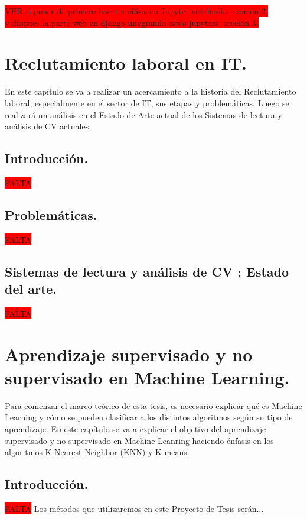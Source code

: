 \documentclass[12pt,a4paper]{article}
\begin{document}
\colorbox{red}{VER si poner de primero hacer análisis en Jupyter notebooks -sección 2-}\\
\colorbox{red}{y despues la parte web en django integrando estos jupyters -sección 3-}\\

\cleardoublepage    %

\section{Reclutamiento laboral en IT.}
En este capítulo se va a realizar un acercamiento a la historia del Reclutamiento laboral, especialmente en el sector de IT, sus etapas y problemáticas.
Luego se realizará un análisis en el Estado de Arte actual de los Sistemas de lectura y análisis de CV actuales.

\subsection{Introducción.}
\colorbox{red}{FALTA}

\subsection{Problemáticas.}
\colorbox{red}{FALTA}

\subsection{Sistemas de lectura y análisis de CV : Estado del arte.}
\colorbox{red}{FALTA}

\section{Aprendizaje supervisado y no supervisado en Machine Learning.}
Para comenzar el marco teórico de esta tesis, es necesario explicar qué es Machine Learning y cómo se pueden clasificar a los distintos algoritmos según su tipo de aprendizaje. 
En este capítulo se va a explicar el objetivo del aprendizaje supervisado y no supervisado en Machine Leanring haciendo énfasis en los algoritmos K-Nearest Neighbor (KNN) y K-means.

\subsection{Introducción.}
\colorbox{red}{FALTA}
Los métodos que utilizaremos en este Proyecto de Tesis serán...
\end{document}
